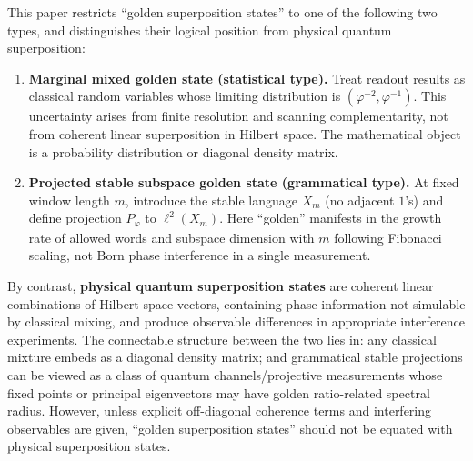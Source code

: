 This paper restricts ``golden superposition states'' to one of the following two types, and distinguishes their logical position from physical quantum superposition:
\begin{enumerate}
  \item \textbf{Marginal mixed golden state (statistical type).} Treat readout results as classical random variables whose limiting distribution is $(\varphi^{-2},\varphi^{-1})$. This uncertainty arises from finite resolution and scanning complementarity, not from coherent linear superposition in Hilbert space. The mathematical object is a probability distribution or diagonal density matrix.
  \item \textbf{Projected stable subspace golden state (grammatical type).} At fixed window length $m$, introduce the stable language $X_m$ (no adjacent $1$'s) and define projection $P_\varphi$ to $\ell^2(X_m)$. Here ``golden'' manifests in the growth rate of allowed words and subspace dimension with $m$ following Fibonacci scaling, not Born phase interference in a single measurement.
\end{enumerate}

By contrast, \textbf{physical quantum superposition states} are coherent linear combinations of Hilbert space vectors, containing phase information not simulable by classical mixing, and produce observable differences in appropriate interference experiments. The connectable structure between the two lies in: any classical mixture embeds as a diagonal density matrix; and grammatical stable projections can be viewed as a class of quantum channels/projective measurements whose fixed points or principal eigenvectors may have golden ratio-related spectral radius. However, unless explicit off-diagonal coherence terms and interfering observables are given, ``golden superposition states'' should not be equated with physical superposition states.
